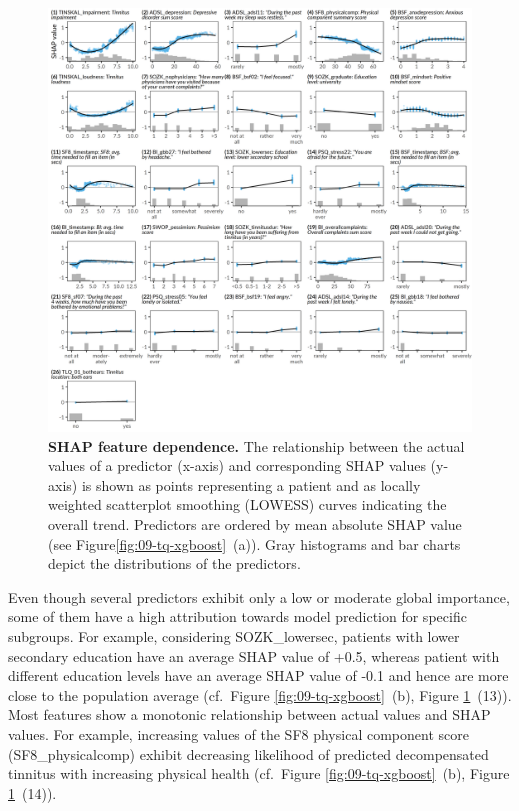 \documentclass[
  oneside]{book}
\begin{document}
\begin{figure}

{\centering \includegraphics[width=1\linewidth]{figures/09-tq-xgboost-shap-per-feature} 

}

\caption{\textbf{SHAP feature dependence.} The relationship between the actual values of a predictor (x-axis) and corresponding SHAP values (y-axis) is shown as points representing a patient and as locally weighted scatterplot smoothing (LOWESS) curves indicating the overall trend. Predictors are ordered by mean absolute SHAP value (see Figure\ref{fig:09-tq-xgboost}~(a)). Gray histograms and bar charts depict the distributions of the predictors.}\label{fig:09-tq-xgboost-shap-per-feature}
\end{figure}

Even though several predictors exhibit only a low or moderate global importance, some of them have a high attribution towards model prediction for specific subgroups.
For example, considering SOZK\_lowersec, patients with lower secondary education have an average SHAP value of +0.5, whereas patient with different education levels have an average SHAP value of -0.1 and hence are more close to the population average (cf.~Figure \ref{fig:09-tq-xgboost}~(b), Figure \ref{fig:09-tq-xgboost-shap-per-feature}~(13)).
Most features show a monotonic relationship between actual values and SHAP values.
For example, increasing values of the SF8 physical component score (SF8\_physicalcomp) exhibit decreasing likelihood of predicted decompensated tinnitus with increasing physical health (cf.~Figure \ref{fig:09-tq-xgboost}~(b), Figure \ref{fig:09-tq-xgboost-shap-per-feature}~(14)).
\end{document}
